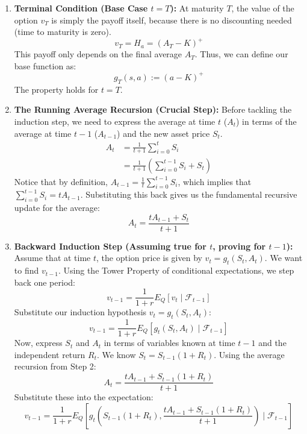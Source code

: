 \begin{enumerate}
    \item \textbf{Terminal Condition (Base Case $t = T$):}
    At maturity $T$, the value of the option $v_T$ is simply the payoff itself, because there is no discounting needed (time to maturity is zero).
    \begin{equation*}
        v_T = H_a = (A_T - K)^+
    \end{equation*}
    This payoff only depends on the final average $A_T$. Thus, we can define our base function as:
    \begin{equation*}
        g_T(s, a) := (a - K)^+
    \end{equation*}
    The property holds for $t=T$.
    
    \item \textbf{The Running Average Recursion (Crucial Step):}
    Before tackling the induction step, we need to express the average at time $t$ ($A_t$) in terms of the average at time $t-1$ ($A_{t-1}$) and the new asset price $S_t$. 
    \begin{align*}
        A_t &= \frac{1}{t+1} \sum_{i=0}^t S_i \\
        &= \frac{1}{t+1} \left( \sum_{i=0}^{t-1} S_i + S_t \right)
    \end{align*}
    Notice that by definition, $A_{t-1} = \frac{1}{t} \sum_{i=0}^{t-1} S_i$, which implies that $\sum_{i=0}^{t-1} S_i = t A_{t-1}$. Substituting this back gives us the fundamental recursive update for the average:
    \begin{equation*}
        A_t = \frac{t A_{t-1} + S_t}{t+1}
    \end{equation*}

    \item \textbf{Backward Induction Step (Assuming true for $t$, proving for $t-1$):}
    Assume that at time $t$, the option price is given by $v_t = g_t(S_t, A_t)$. We want to find $v_{t-1}$.
    Using the Tower Property of conditional expectations, we step back one period:
    \begin{equation*}
        v_{t-1} = \frac{1}{1+r} E_Q[ v_t \mid \mathcal{F}_{t-1} ]
    \end{equation*}
    Substitute our induction hypothesis $v_t = g_t(S_t, A_t)$:
    \begin{equation*}
        v_{t-1} = \frac{1}{1+r} E_Q[ g_t(S_t, A_t) \mid \mathcal{F}_{t-1} ]
    \end{equation*}
    Now, express $S_t$ and $A_t$ in terms of variables known at time $t-1$ and the independent return $R_t$. We know $S_t = S_{t-1}(1+R_t)$. Using the average recursion from Step 2:
    \begin{equation*}
        A_t = \frac{t A_{t-1} + S_{t-1}(1+R_t)}{t+1}
    \end{equation*}
    Substitute these into the expectation:
    \begin{equation*}
        v_{t-1} = \frac{1}{1+r} E_Q\left[ g_t\left(S_{t-1}(1+R_t), \frac{t A_{t-1} + S_{t-1}(1+R_t)}{t+1}\right) \mid \mathcal{F}_{t-1} \right]
    \end{equation*}
    

\end{enumerate}

